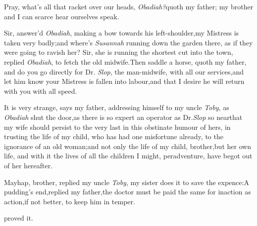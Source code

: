 \documentclass{article}
\begin{document}
Pray, what’s all that racket over our heads,
\textit{Obadiah?}\tsk quoth my father;\tsk\break
my brother and I can scarce hear ourselves speak.

Sir, answer’d \textit{Obadiah}, making a bow
towards his left-shoulder,\tsk my Mistress
is taken very badly;\tsk and where’s \textit{Susannah}
running down the garden there,
as if they were going to ravish her?\tsh\break
Sir, she is running the shortest cut into the town, replied
\textit{Obadiah}, to fetch the old midwife.\tsh Then saddle a
horse, quoth my father, and do you go direct\-ly for Dr.\@
\textit{Slop}, the man-midwife, with all our services,\tsk and
let him know your Mistress is fallen into labour,\tsk and that I
desire he will return with you with all speed.

It is very strange, says my father, addressing himself to my
uncle \textit{Toby}, as \textit{Obadiah} shut the door,\tsh as
there is so expert an operator as Dr.\@ \textit{Slop} so
near\tsk\break that my wife should persist to the very last in
this obstinate humour of hers, in trusting the life of my child,
who has had one misfortune already, to the ignorance of an old
woman;\tsh and not only the life of my child, brother,\tsh but
her own life, and with it the lives of all the children I might,
peradventure, have begot out of her hereafter.

Mayhap, brother, replied my uncle\break
\textit{Toby}, my sister does it to save the expence:\tsk A
pudding’s end,\tsk replied my father,\tsh the doctor must be
paid the same for inaction as action,\tsk if not better,\tsk
to keep him in temper.

\noindent
{}
proved it.
\end{document}
